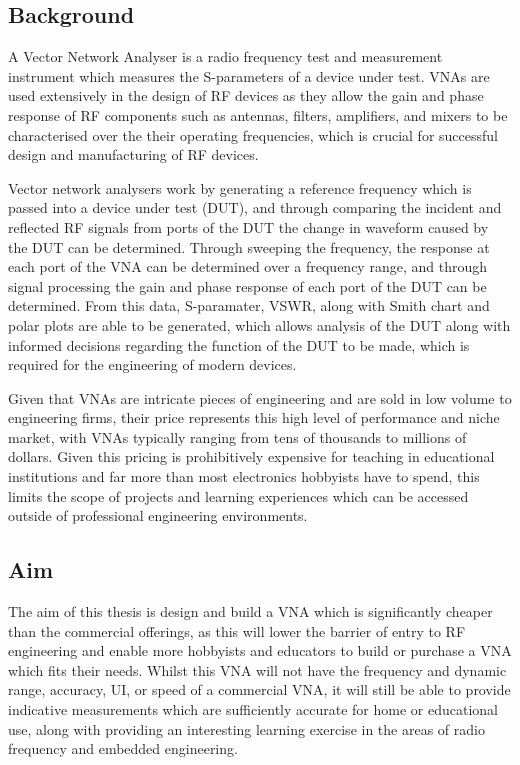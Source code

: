 \subsection{Background}
A Vector Network Analyser is a radio frequency test and measurement instrument which measures the S-parameters of a device under test. VNAs are used extensively in the design of RF devices as they allow the gain and phase response of RF components such as antennas, filters, amplifiers, and mixers to be characterised over the their operating frequencies, which is crucial for successful design and manufacturing of RF devices.

Vector network analysers work by generating a reference frequency which is passed into a device under test (DUT), and through comparing the incident and reflected RF signals from ports of the DUT the change in waveform caused by the DUT can be determined. Through sweeping the frequency, the response at each port of the VNA can be determined over a frequency range, and through signal processing the gain and phase response of each port of the DUT can be determined. From this data, S-paramater, VSWR, along with Smith chart and polar plots are able to be generated, which allows analysis of the DUT along with informed decisions regarding the function of the DUT to be made, which is required for the engineering of modern devices. 

Given that VNAs are intricate pieces of engineering and are sold in low volume to engineering firms, their price represents this high level of performance and niche market, with VNAs typically ranging from tens of thousands to millions of dollars. Given this pricing is prohibitively expensive for teaching in educational institutions and far more than most electronics hobbyists have to spend, this limits the scope of projects and learning experiences which can be accessed outside of professional engineering environments. 

\subsection{Aim}
The aim of this thesis is design and build a VNA which is significantly cheaper than the commercial offerings, as this will lower the barrier of entry to RF engineering and enable more hobbyists and educators to build or purchase a VNA which fits their needs. Whilst this VNA will not have the frequency and dynamic range, accuracy, UI, or speed of a commercial VNA, it will still be able to provide indicative measurements which are sufficiently accurate for home or educational use, along with providing an interesting learning exercise in the areas of radio frequency and embedded engineering.  

